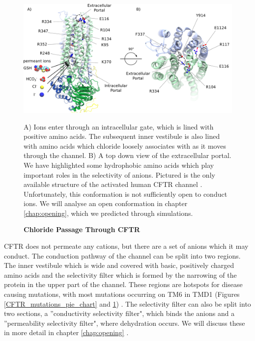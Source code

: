 \begin{figure}
	\begin{center}
	\includegraphics[width=\textwidth]{figures/chloride_passage_figure.pdf}
	\end{center}
	\captionsetup{singlelinecheck = false, justification=raggedright}
	\caption[Chloride Passage through CFTR] {\textbf{Chloride Passage Through CFTR}}{A) Ions enter through an intracellular gate, which is lined with positive amino acids. The subsequent inner vestibule is also lined with amino acids which chloride loosely associates with as it moves through the channel. B) A top down view of the extracellular portal. We have highlighted some hydrophobic amino acids which play important roles in the selectivity of anions. Pictured is the only available structure of the activated human CFTR channel \cite{zhang2018}. Unfortunately, this conformation is not sufficiently open to conduct ions. We will analyse an open conformation in chapter \ref{chap:opening}, which we predicted through simulations.} 
	\label{chloride_passage}

\end{figure}

CFTR does not permeate any cations, but there are a set of anions which it may conduct. The conduction pathway of the channel can be split into two regions. The inner vestibule which is wide and covered with basic, positively charged amino acids and the selectivity filter which is formed by the narrowing of the protein in the upper part of the channel. These regions are hotspots for disease causing  mutations, with most mutations occurring on TM6 in TMD1 (Figures \ref{CFTR_mutations_pie_chart} and \ref{chloride_passage}) \cite{cftr2}. The selectivity filter can also be split into two sections, a ''conductivity selectivity filter", which binds the anions and a ''permeability selectivity filter", where dehydration occurs. We will discuss these in more detail in chapter \ref{chap:opening} \cite{linsdell2016}. 

